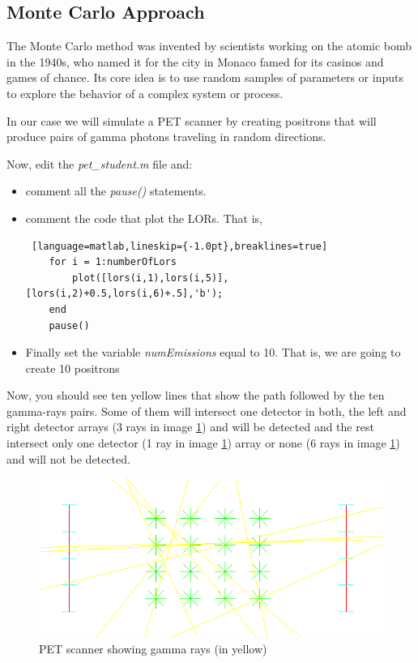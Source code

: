 \documentclass[12pt]{article} %
\begin{document}
\subsection{Monte Carlo Approach}
\label{sec:monteCarlo}
The Monte Carlo method was invented by scientists working on the atomic bomb in the 1940s, who named it for the city in Monaco famed for its casinos and games of chance.  Its core idea is to use random samples of parameters or inputs to explore the behavior of a complex system or process. 

In our case we will simulate a PET scanner by creating  positrons that will produce pairs of gamma photons traveling in random directions.

Now, edit the \emph{pet\_student.m} file and:

\begin{itemize}
    \item comment all the \emph{pause()} statements. 
    \item comment the code that plot the LORs. That is,
    \begin{lstlisting} [language=matlab,lineskip={-1.0pt},breaklines=true] 
    for i = 1:numberOfLors
        plot([lors(i,1),lors(i,5)],[lors(i,2)+0.5,lors(i,6)+.5],'b');
    end
    pause()
    \end{lstlisting}
    \item Finally set the variable \emph{numEmissions} equal to 10. That is, we are going to create
    10 positrons
\end{itemize}

Now, you should see ten yellow lines that show the path followed by the ten gamma-rays pairs. Some of them will intersect one detector in both, the left and right detector arrays (3 rays in image \ref{fig:montecarlo}) and will be detected and the rest intersect only one detector (1 ray in image \ref{fig:montecarlo}) array or none (6 rays in image \ref{fig:montecarlo}) and will not be detected.

\begin{figure}[H]
\includegraphics{images/montecarlo.png}
\caption{PET scanner showing gamma rays (in yellow) \label{fig:montecarlo}}
\end{figure}
\end{document}
